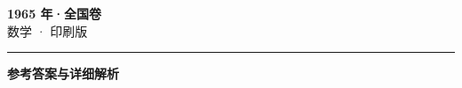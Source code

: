 \documentclass[zihao=5, a4paper]{ctexart}
\begin{document}
\begin{center}
  {\Large\bfseries 1965 年·全国卷}\\[4pt]
  {\large 数学 · 印刷版}
\end{center}
\medskip
{}

\par\bigskip\hrule\bigskip
{}
\begin{center}{\large\bfseries 参考答案与详细解析}\end{center}
\smallskip

\end{document}
